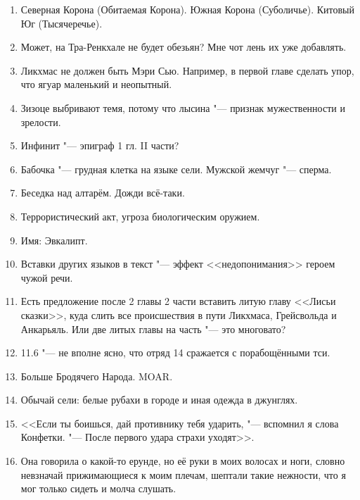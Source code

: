 \begin{enumerate}
\item Северная Корона (Обитаемая Корона).
Южная Корона (Суболичье).
Китовый Юг (Тысячеречье).

\item Может, на Тра-Ренкхале не будет обезьян?
Мне чот лень их уже добавлять.

\item Ликхмас не должен быть Мэри Сью.
Например, в первой главе сделать упор, что ягуар маленький и неопытный.

\item Зизоце выбривают темя, потому что лысина "--- признак мужественности и зрелости.

\item Инфинит "--- эпиграф 1 гл. II части?

\item Бабочка "--- грудная клетка на языке сели.
Мужской жемчуг "--- сперма.

\item Беседка над алтарём.
Дожди всё-таки.

\item Террористический акт, угроза биологическим оружием.

\item Имя: Эвкалипт.

\item Вставки других языков в текст "--- эффект <<недопонимания>> героем чужой речи.

\item Есть предложение после 2 главы 2 части вставить литую главу <<Лисьи сказки>>, куда слить все происшествия в пути Ликхмаса, Грейсвольда и Анкарьяль.
Или две литых главы на часть "--- это многовато?

\item 11.6 "--- не вполне ясно, что отряд 14 сражается с порабощёнными тси.

\item Больше Бродячего Народа.
MOAR.

\item Обычай сели: белые рубахи в городе и иная одежда в джунглях.

\item <<Если ты боишься, дай противнику тебя ударить, "--- вспомнил я слова Конфетки.
"--- После первого удара страхи уходят>>.

\item Она говорила о какой-то ерунде, но её руки в моих волосах и ноги, словно невзначай прижимающиеся к моим плечам, шептали такие нежности, что я мог только сидеть и молча слушать.


\end{enumerate}
